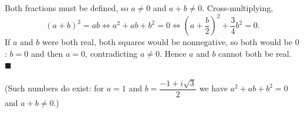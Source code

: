 Both fractions must be defined, so $a\ne0$ and $a+b\ne0$. Cross-multiplying,
\[(a+b)^2=ab\iff a^2+ab+b^2=0\iff\left(a+\dfrac b2\right)^2+\dfrac34b^2=0.\]
If $a$ and $b$ were both real, both squares would be nonnegative, so both would be $0$: $b=0$ and then $a=0$, contradicting $a\ne0$. Hence $a$ and $b$ cannot both be real. $\blacksquare$

(Such numbers do exist: for $a=1$ and $b=\dfrac{-1+i\sqrt3}{2}$ we have $a^2+ab+b^2=0$ and $a+b\ne0$.)
